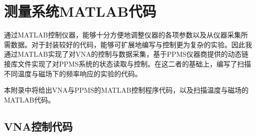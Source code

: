 \chapter{测量系统MATLAB代码} %
\label{cha:measurement_code}

通过MATLAB控制仪器，能够十分方便地调整仪器的各项参数以及从仪器采集所需数据。对于封装较好的代码，能够可扩展地编写与控制更为复杂的实验。因此我通过MATLAB实现了对VNA的控制与数据采集，基于PPMS仪器商提供的动态链接库文件实现了对PPMS系统的状态读取与控制。在这二者的基础上，编写了扫描不同温度与磁场下的频率响应的实验的代码。

本附录中将给出VNA与PPMS的MATLAB控制程序代码，以及扫描温度与磁场的MATLAB代码。


  \section{VNA控制代码} %
  \label{sec:vna控制代码}

